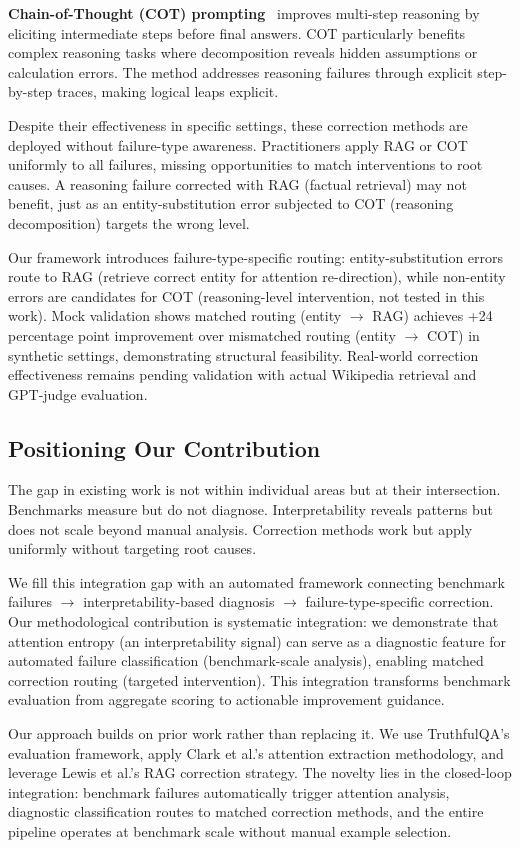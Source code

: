 \textbf{Chain-of-Thought (COT) prompting}~\cite{Wei2022COT} improves multi-step reasoning by eliciting intermediate steps before final answers. COT particularly benefits complex reasoning tasks where decomposition reveals hidden assumptions or calculation errors. The method addresses reasoning failures through explicit step-by-step traces, making logical leaps explicit.

Despite their effectiveness in specific settings, these correction methods are deployed without failure-type awareness. Practitioners apply RAG or COT uniformly to all failures, missing opportunities to match interventions to root causes. A reasoning failure corrected with RAG (factual retrieval) may not benefit, just as an entity-substitution error subjected to COT (reasoning decomposition) targets the wrong level.

Our framework introduces failure-type-specific routing: entity-substitution errors route to RAG (retrieve correct entity for attention re-direction), while non-entity errors are candidates for COT (reasoning-level intervention, not tested in this work). Mock validation shows matched routing (entity $\to$ RAG) achieves +24 percentage point improvement over mismatched routing (entity $\to$ COT) in synthetic settings, demonstrating structural feasibility. Real-world correction effectiveness remains pending validation with actual Wikipedia retrieval and GPT-judge evaluation.

\subsection{Positioning Our Contribution}

The gap in existing work is not within individual areas but at their intersection. Benchmarks measure but do not diagnose. Interpretability reveals patterns but does not scale beyond manual analysis. Correction methods work but apply uniformly without targeting root causes.

We fill this integration gap with an automated framework connecting benchmark failures $\to$ interpretability-based diagnosis $\to$ failure-type-specific correction. Our methodological contribution is systematic integration: we demonstrate that attention entropy (an interpretability signal) can serve as a diagnostic feature for automated failure classification (benchmark-scale analysis), enabling matched correction routing (targeted intervention). This integration transforms benchmark evaluation from aggregate scoring to actionable improvement guidance.

Our approach builds on prior work rather than replacing it. We use TruthfulQA's evaluation framework, apply Clark et al.'s attention extraction methodology, and leverage Lewis et al.'s RAG correction strategy. The novelty lies in the closed-loop integration: benchmark failures automatically trigger attention analysis, diagnostic classification routes to matched correction methods, and the entire pipeline operates at benchmark scale without manual example selection.
